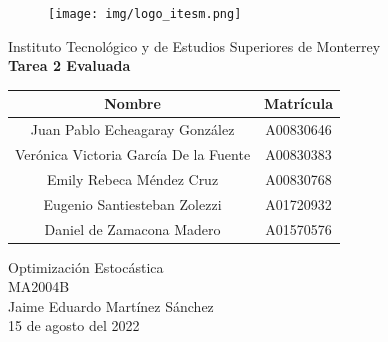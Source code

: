 \documentclass{article}
\begin{document}
    \begin{titlepage}
        \begin{center}
            \begin{figure}
                \centering
                \texttt{[image: img/logo\_itesm.png]}\\ %
            \end{figure}
        \vspace{5cm}
        \LARGE{Instituto Tecnológico y de Estudios Superiores de Monterrey}\\
        \fontsize{12}{14}\selectfont
        \vspace{1cm}
        \textbf{Tarea 2 Evaluada}\\ %
        \vspace{0.7cm}
        \begin{table}[h!]
            \centering
            \begin{tabular}{ ||c|c|| }
                \hline
                Nombre & Matrícula \\
                \hline
                Juan Pablo Echeagaray González & A00830646 \\
                \hline
                Verónica Victoria García De la Fuente & A00830383 \\
                \hline
                Emily Rebeca Méndez Cruz & A00830768 \\
                \hline
                Eugenio Santiesteban Zolezzi & A01720932 \\
                \hline
                Daniel de Zamacona Madero & A01570576 \\
                \hline
            \end{tabular}
        \end{table}
        \vspace{0.7cm}
        Optimización Estocástica\\ %
        \vspace{0.2cm}
        MA2004B\\ %
        \vspace{0.2cm}
        Jaime Eduardo Martínez Sánchez\\ %
        \vspace{0.7cm}
        15 de agosto del 2022\\ %
        \end{center}
    \end{titlepage}
\end{document}
